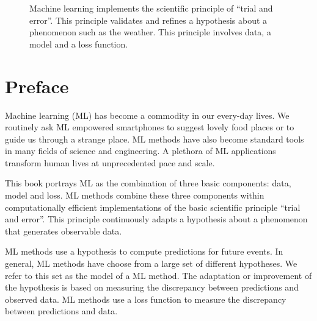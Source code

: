\documentclass[12pt]{report}
\begin{document}
\begin{center}
\begin{figure}[htbp]
	\vspace*{-13mm}
	\caption{
		Machine learning implements the scientific principle of ``trial and error''. 
		This principle validates and refines a hypothesis about a phenomenon 
		such as the weather. This principle involves data, a model and a loss 
		function.}
	\label{fig_AlexMLBP}
\end{figure}
\end{center}



\newpage
\chapter*{Preface}

Machine learning (ML) has become a commodity in our every-day lives. 
We routinely ask ML empowered smartphones to suggest lovely food 
places or to guide us through a strange place. ML methods have also 
become standard tools in many fields of science and engineering. A 
plethora of ML applications transform human lives at unprecedented 
pace and scale. 

This book portrays ML as the combination of three basic components: 
data, model and loss. ML methods combine these three components 
within computationally efficient implementations of the basic scientific 
principle ``trial and error''. This principle continuously adapts a hypothesis 
about a phenomenon that generates observable data. 

ML methods use a hypothesis to compute predictions for future events. 
In general, ML methods have choose from a large set of different hypotheses. 
We refer to this set as the model of a ML method. The adaptation or 
improvement of the hypothesis is based on measuring the discrepancy 
between predictions and observed data. ML methods use a loss function 
to measure the discrepancy between predictions and data.
\end{document}
